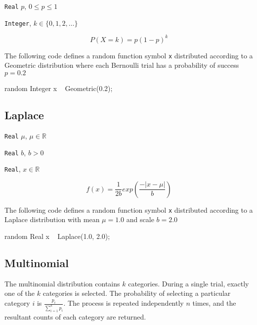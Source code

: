 \begin{itemize*}
\item[] \verb|Real|
 $p$, $0 \leq p \leq 1$ 
\end{itemize*}

\begin{itemize*}
\item[] \verb|Integer|, $k \in \{0, 1, 2, \ldots \}$ 
\end{itemize*}

\[
	P(X = k) = p(1-p)^{k}
\]

The following code defines a random function symbol \verb|x| distributed according to a Geometric distribution where each Bernoulli trial has a probability of success $p = 0.2$
\begin{blogcode}
random Integer x ~ Geometric(0.2);
\end{blogcode}

\subsection{Laplace}

\begin{itemize*}
\item[] \verb|Real| $\mu$, $\mu \in \mathbb{R}$
\item[] \verb|Real| $b$, $b > 0$
 
\end{itemize*}

\begin{itemize*}
\item[] \verb|Real|, $x \in \mathbb{R}$ 
\end{itemize*}

\[
	f(x) = \frac{1}{2b} exp(\frac{-|x-\mu|}{b})
\]

The following code defines a random function symbol \verb|x| distributed according to a Laplace distribution with mean $\mu = 1.0$ and scale $b = 2.0$
\begin{blogcode}
random Real x ~ Laplace(1.0, 2.0);
\end{blogcode}


\subsection{Multinomial}
 The multinomial distribution contains $k$ categories. During a single trial, exactly one of the $k$ categories is selected. The probability of selecting a particular category $i$ is $\frac{p_{i}}{\sum_{i=1}^{k} p_{i}}$. The process is repeated independently $n$ times, and the resultant counts of each category are returned.
 
